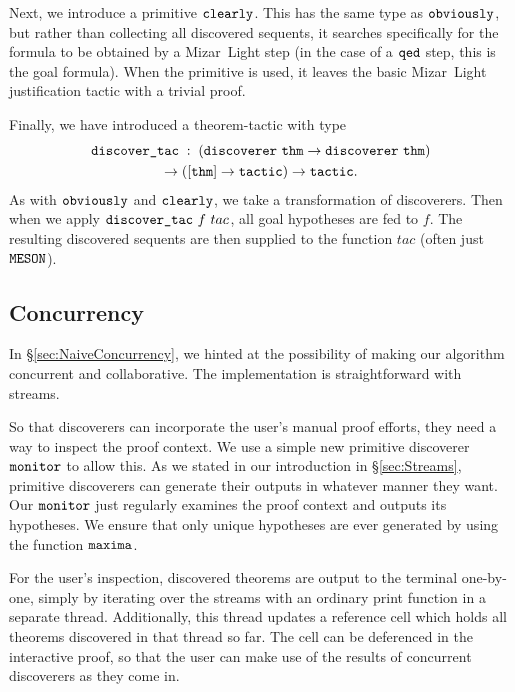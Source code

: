 Next, we introduce a primitive $\texttt{clearly}$. This has the same type as $\texttt{obviously}$, but rather than collecting all discovered sequents, it searches specifically for the formula to be obtained by a Mizar~Light step (in the case of a $\texttt{qed}$ step, this is the goal formula). When the  primitive is used, it leaves the basic Mizar~Light justification tactic with a trivial proof.

\label{sec:DiscoverTac}
Finally, we have introduced a theorem-tactic  with type
\begin{multline*}
\code{discover\_tac}\;:\;(\code{discoverer}\ \code{thm}\rightarrow\code{discoverer} \ \code{thm}) \\\rightarrow ([\code{thm}] \rightarrow \code{tactic}) \rightarrow \code{tactic}.
\end{multline*}
As with $\texttt{obviously}$ and $\texttt{clearly}$, we take a transformation of discoverers. Then when we apply $\texttt{discover\_tac}\ f\ tac$,  all goal hypotheses are fed to $f$. The resulting discovered sequents are then supplied to the function $tac$ (often just $\texttt{MESON}$).

\subsection{Concurrency}\label{sec:Concurrency}
In \S\ref{sec:NaiveConcurrency}, we hinted at the possibility of making our algorithm concurrent and collaborative. The implementation is straightforward with streams.

So that discoverers can incorporate the user's manual proof efforts, they need a way to inspect the proof context. We use a simple new primitive discoverer $\texttt{monitor}$ to allow this. As we stated in our introduction in \S\ref{sec:Streams}, primitive discoverers can generate their outputs in whatever manner they want. Our $\texttt{monitor}$ just regularly examines the proof context and outputs its hypotheses. We ensure that only unique hypotheses are ever generated by using the function $\texttt{maxima}$.

For the user's inspection, discovered theorems are output to the terminal one-by-one, simply by iterating over the streams with an ordinary print function in a separate thread. Additionally, this thread updates a reference cell  which holds all theorems discovered in that thread so far. The cell can be deferenced in the interactive proof, so that the user can make use of the results of concurrent discoverers as they come in.

